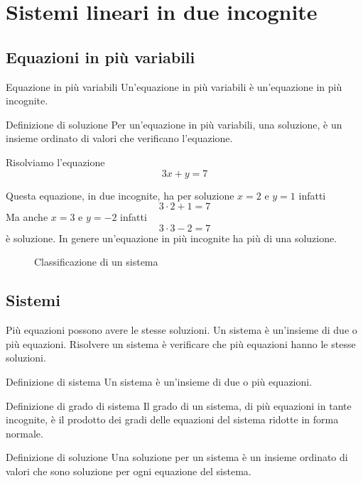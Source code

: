 \chapter{Sistemi lineari in due incognite}
\label{sec:sistemiLineariInDueIncognite}
\section{Equazioni in più variabili}
\label{sec:EquazioniInPiuVariabili}
\begin{definizionet}{Equazione in più variabili}{}
	Un'equazione in più variabili è un'equazione in più incognite.
\end{definizionet}
\begin{definizionet}{Definizione di soluzione}{}
Per un'equazione in più variabili, una soluzione, è un insieme ordinato di valori che verificano l'equazione.
\end{definizionet}
\begin{esempiot}{}{}
	Risolviamo l'equazione\[ 3x+y=7\]
\end{esempiot}	
Questa equazione, in due incognite, ha per soluzione
$x=2$ e $y=1$ infatti \[3\cdot2+1=7\]
Ma anche $x=3$ e $y=-2$ infatti \[3\cdot3-2=7\] è soluzione.
In genere un'equazione in più incognite ha più di una soluzione.
\begin{figure}
	\centering

	\caption{Classificazione di un sistema}
	\label{fig:ClassificazioneDiUnSistema}
\end{figure}
\section{Sistemi}
\label{sec:Sistemi}
Più  equazioni  possono avere le stesse soluzioni. Un sistema è un'insieme di due o più equazioni. Risolvere un sistema è verificare che più equazioni hanno le stesse soluzioni.
\begin{definizionet}{Definizione di sistema}{}
Un sistema è un'insieme di due o più  equazioni.
\end{definizionet}
\begin{definizionet}{Definizione di grado di sistema}{}\label{def:sistemaGrado}
Il grado di un sistema, di più equazioni in tante incognite,  è il prodotto dei gradi delle equazioni del sistema ridotte in forma normale.
\end{definizionet}
\begin{definizionet}{Definizione di soluzione}{}
Una soluzione per un sistema è un insieme ordinato di valori che sono soluzione per ogni equazione del sistema.
\end{definizionet}
